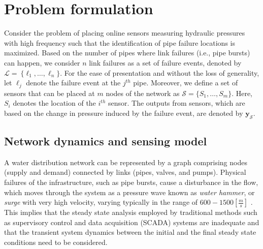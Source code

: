 \documentclass[twocolumn]{autart}
\begin{document}
\section{Problem formulation}\label{sec:problem}\vspace{-0.35cm}
Consider the problem of placing online sensors measuring hydraulic pressures with high frequency such that the identification of pipe failure locations is maximized. Based on the number of pipes where link failures (i.e., pipe bursts) can happen, we consider $n$ link failures as a set of failure events, denoted by $\mathcal{L}  = ~ \{ \ell_1, \dots, \ell_n \}$. For the ease of presentation and without the loss of generality, let $\ell_j$ denote the failure event at the $j^{th}$ pipe. Moreover, we define a set of  sensors that can be placed at $m$ nodes of the network as $\mathcal{S}= \{ S_1, \dots, S_m \}$. Here, $S_i$ denotes the location of the $i^{th}$ sensor. 
The outputs from sensors, which are based on the change in pressure induced by the failure event, are denoted by $\mathbf{y}_{{\mathcal{S}}}$.

\subsection{Network dynamics and sensing model}\vspace{-0.35cm}
A water distribution network can be represented by a graph comprising nodes (supply and demand) connected by links (pipes, valves, and pumps). 
Physical failures of the infrastructure, such as pipe bursts, cause a disturbance in the flow, which moves through the system as a pressure wave known as \textit{water hammer}, or \textit{surge} with very high velocity, varying typically in the range of $600 - 1500 [\frac{m}{s}]$ \cite{Dalius}. This implies that the steady state analysis employed by traditional methods such as supervisory control and data acquisition (SCADA) systems are inadequate and that the transient system dynamics between the initial and the final steady state conditions need to be considered. \vspace{-0.25cm}
\end{document}
